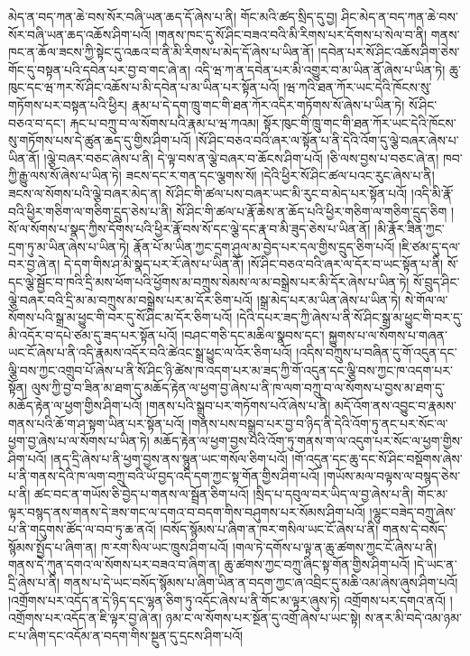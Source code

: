 མེད་ན་བད་ཀན་ཆེ་བས་སོར་བཞི་ཡན་ཆད་དོ་ཞེས་པ་ནི། གོང་མའི་ཚད་སྲིད་དུ་བྱ། ཤིང་མེད་ན་བད་ཀན་ཆེ་བས་སོར་བཞི་ཡན་ཆད་འཆོས་ཤིག་པའོ། །གནས་ཁང་དུ་སོ་ཤིང་བཟའ་བའི་མི་རིགས་པར་དོགས་པ་སེལ་བ་ནི། གནས་ཁང་ན་ཆོལ་ཟངས་ཀྱི་སྟེང་དུ་འཆའ་བ་ནི་མི་རིགས་པ་མེད་དོ་ཞེས་པ་ཡིན་ནོ། །དབེན་པར་སོ་ཤིང་འཆོས་ཤིག་ཅེས་གོང་དུ་བསྟན་པའི་དབེན་པར་བྱ་བ་གང་ཞེ་ན། འདི་ཝ་ཀ་ན་དབེན་པར་མི་འགྱུར་བ་མ་ཡིན་ནོ་ཞེས་པ་ཡིན་ཏེ། ཆུ་ཁུང་དང་ཝ་ཀར་སོ་ཤིང་འཆོས་པ་མི་དབེན་པ་མ་ཡིན་པར་སྟོན་པའོ། །ཝ་ཀའི་ཐན་ཀོར་ཡང་དེའི་ཁོངས་སུ་གཏོགས་པར་བསྟན་པའི་ཕྱིར། རྣམ་པ་དེ་དག་ཁྲུ་གང་གི་ཐན་ཀོར་འདིར་གཏོགས་སོ་ཞེས་པ་ཡིན་ཏེ། སོ་ཤིང་བཅའ་བ་དང་། རྐང་པ་བཀྲུ་བ་ལ་སོགས་པའི་རྣམ་པ་ཝ་ཀའམ། སྟོར་ཁུང་གི་ཁྲུ་གང་གི་ཐན་ཀོར་ཡང་དེའི་ཁོངས་སུ་གཏོགས་པས་དེ་ཚུན་ཆད་དུ་གྱིས་ཤིག་པའོ། །སོ་ཤིང་བཅའ་བའི་ཞར་ལ་སྟོན་པ་ནི་དེའི་འོག་དུ་ལྕེ་བཞར་ཞེས་པ་ཡིན་ནོ། །ལྕེ་བཞར་བཅང་ཞེས་པ་ནི། དེ་ལྟ་བས་ན་ལྕེ་བཞར་བ་ཆོངས་ཤིག་པའོ། །ཅི་ལས་བྱས་པ་བཅང་ཞེ་ན། ཁབ་ཀྱི་རྒྱུ་ལས་སོ་ཞེས་པ་ཡིན་ཏེ། ཟངས་དང་ར་གན་དང་ལྕགས་སོ། །དེའི་ཕྱིར་སོ་ཤིང་ཚལ་པའང་རུང་ཞེས་པ་ནི། ཟངས་ལ་སོགས་པའི་ལྕེ་བཞར་མེད་ན། སོ་ཤིང་གི་ཚལ་པས་བཞར་ཡང་མི་རུང་བ་མེད་པར་སྟོན་པའོ། །འདི་མི་རྣོ་བའི་ཕྱིར་གཅིག་ལ་གཅིག་དྲུད་ཅེས་པ་ནི། སོ་ཤིང་གི་ཚལ་པ་རྣོ་ཆེས་ན་ཆོད་པའི་ཕྱིར་གཅིག་ལ་གཅིག་དྲུད་ཅིག །སོ་ལ་སོགས་པ་སྣད་ཀྱིས་དོགས་པའི་ཕྱིར་རྣོ་བས་སོ་དང་ལྕེ་དང་རྣ་བ་མི་ཟུད་ཅེས་པ་ཡིན་ནོ། །མི་རྣོར་ཟིན་ཀྱང་དྲག་ཏུ་མ་ཡིན་ཞེས་པ་ཡིན་ཏེ། རྣོན་པོ་མ་ཡིན་ཀྱང་དྲག་ཤུལ་མ་བྱེད་པར་དལ་གྱིས་དྲུད་ཅིག་པའོ། །ཇི་ཙམ་དུ་དལ་བར་བྱ་ཞེ་ན། དེ་དག་གིས་ཤ་མི་སྣད་པར་རོ་ཞེས་པ་ཡིན་ནོ། །སོ་ཤིང་བཅའ་བའི་ཞར་ལ་དོར་བ་ཡང་སྟོན་པ་ནི། སོ་དང་ལྕེ་སྦྱོང་བ་ཁའི་དྲི་མས་ཕོག་པའི་ཕྱོགས་མ་བཀྲུས་སེམས་ལ་མ་བསྒྲེས་པར་མི་དོར་ཞེས་པ་ཡིན་ཏེ། སོ་བྲུད་ཤིང་ལྕེ་བཞར་བའི་དྲི་མ་མ་བཀྲུས་མ་བསྒྲེས་པར་མ་དོར་ཅིག་པའོ། །སྒྲ་མེད་པར་མ་ཡིན་ཞེས་པ་ཡིན་ཏེ། སེ་གོལ་ལ་སོགས་པའི་སྒྲ་མ་ཕྱུང་གི་བར་དུ་སོ་ཤིང་མ་དོར་ཅིག་པའོ། །དེའི་དཔར་ཟད་ཀྱི་ཞེས་པ་ནི་སོ་ཤིང་སྒྲ་མ་ཕྱུང་གི་བར་དུ་མི་འདོར་བ་དཔེ་ཙམ་དུ་ཟད་པར་སྟོན་པའོ། །བཤང་གཅི་དང་མཆིལ་སྣབས་དང་། སྐྱུགས་པ་ལ་སོགས་པ་གཞན་ཡང་ངོ་ཞེས་པ་ནི་འདི་རྣམས་འདོར་བའི་ཚེའང་སྒྲ་ཕྱུང་ལ་འོར་ཅིག་པའོ། །འདིས་བཀྲུས་པ་བཞིན་དུ་གོ་འདུན་དང་ལྕི་བས་ཀྱང་འགྲུབ་པོ་ཞེས་པ་ནི་སོ་ཤིང་ཉི་ཚེས་ཁ་འདག་པར་མ་ཟད་ཀྱི་གོ་འདུན་དང་ལྕི་བས་ཀྱང་ཁ་འདག་པར་སྟོན། ལུས་ཀྱི་བྱ་བ་ཟིན་མ་ཐག་དུ་མཆོད་རྟེན་ལ་ཕྱག་བྱ་ཞེས་པ་ནི་ཁ་ལག་བཀྲུ་བ་ལ་སོགས་པ་བྱས་མ་ཐག་དུ་མཆོད་རྟེན་ལ་ཕྱག་གྱིས་ཤིག་པའོ། །གནས་པའི་སྒྲུབ་པར་གཏོགས་པའོ་ཞེས་པ་ནི། མདོ་འོག་ནས་འབྱུང་བ་རྣམས་གནས་པའི་ཆོ་ག་ཤ་སྟག་ཡིན་པར་སྟོན་པའོ། །གནས་པས་བསྒྲུབ་པར་བྱ་བ་ཉིད་ནི་དེའི་འོག་ཏུ་ནང་པར་སོང་ལ་ཕྱག་བྱ་ཞེས་པ་ལ་སོགས་པ་ཡིན་ཏེ། མཆོད་རྟེན་ལ་ཕྱག་བྱས་པའི་འོག་ཏུ་གནས་ག་ལ་འདུག་པར་སོང་ལ་ཕྱག་གྱིས་ཤིག་པའོ། །ནད་དྲི་ཞེས་པ་ནི་ཕྱག་བྱས་ནས་སྙུན་ཡང་གསོལ་ཅིག་པའོ། །གོ་འདུན་དང་ཆུ་དང་སོ་ཤིང་བསྡོགས་ཞེས་པ་ནི་གནས་དེའི་ཁ་ལག་བཀྲུ་བའི་ཡོ་བྱད་འདི་དག་ཀྱང་སྟ་གོན་གྱིས་ཤིག་པའོ། །གཡོས་མལ་བལྟས་ལ་བསྙད་ཅེས་པ་ནི། ཚང་བང་ན་གཡོས་ཅི་བྱེད་པ་གནས་ལ་སྦྲོན་ཅིག་པའོ། །སྲིད་པ་དབུལ་བར་ཡིད་ལ་བྱ་ཞེས་པ་ནི། གོང་མ་ལྟར་བསྙད་ནས་གནས་དེ་ཟས་གང་ལ་དགའ་བ་བདག་གིས་བཤུགས་པར་སོམས་ཤིག་པའོ། །ལྷུང་བཟེད་བཀྲུ་ཞེས་པ་ནི་གདུགས་ཚོད་ལ་བབ་ཏུ་ཆ་ནའོ། །བསོད་སྙོམས་པ་ཞིག་ན་ཁར་གསིལ་ཡང་ངོ་ཞེས་པ་ནི། གནས་དེ་བསོད་སྙོམས་སྤྱོད་པ་ཞིག་ན། ཁ་རག་སིལ་ཡང་ཁྲུས་ཤིག་པའོ། །གལ་ཏེ་དགོས་པ་ལྟ་ན་ཆུ་ཚགས་ཀྱང་ངོ་ཞེས་པ་ནི། གནས་དེ་ཀུན་དགའ་ལ་སོགས་པར་བཟའ་བ་ཞིག་ན། ཆུ་ཚགས་ཀྱང་བཀྲུ་ཞིང་སྟ་གོན་གྱིས་ཤིག་པའོ། །དེ་ཡང་ན་དྲི་ཞེས་པ་ནི། གནས་པ་དེ་ཡང་བསོད་སྙོམས་པ་ཞིག་ཡིན་ན་བདག་ཀྱང་ཞ་འབྲིང་དུ་མཆི་འམ་ཞེས་ཞུས་ཤིག་པའོ། །འགྲོགས་པར་འདོད་ན་དེ་ཉིད་དང་ལྷན་ཅིག་ཏུ་འདོང་ཞེས་པ་ནི་གོང་མ་ལྟར་ཞུས་ཏེ། འགྲོགས་པར་དགའ་ནའོ། །འགྲོགས་པར་འདོད་ན་ཇི་ལྟར་བྱ་ཞེ་ན། ཉམ་ང་ལ་སོགས་པར་སྔོན་དུ་འགྲོ་ཞེས་པ་ཡང་སྟེ། ས་ནར་མི་བདེ་འམ་ཉམ་ང་པ་ཞིག་དང་འདོམ་ན་བདག་གིས་སྔུན་དུ་དྲངས་ཤིག་པའོ། 